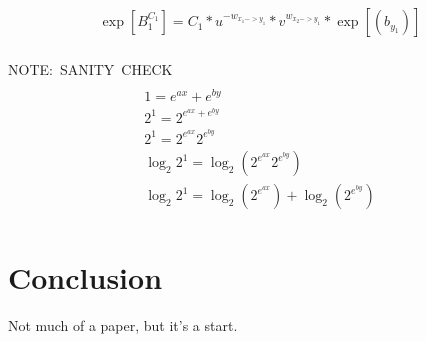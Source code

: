 \documentclass{article}
\begin{document}
\begin{multline}\\
    \exp[B_1^{C_1}] = {C_1}*u^{-w_{x_1->y_1}}*
                            v^{w_{x_2->y_1} }*
                            \exp[(b_{y_1})]\\ 
\end{multline}

\hbox{NOTE: SANITY CHECK}
\begin{multline}\\
    1 = e^{ax}+e^{by}\\
    2^{1} = 2^{e^{ax}+e^{by}}\\
    2^{1} = 2^{e^{ax}}2^{e^{by}}\\
    \log_{2}2^{1} = \log_{2}(2^{e^{ax}}2^{e^{by}})\\
    \log_{2}2^{1} = \log_{2}(2^{e^{ax}}) + \log_{2}(2^{e^{by}})\\
\end{multline}








\section{Conclusion}
Not much of a paper, but it's a start.
\end{document}
